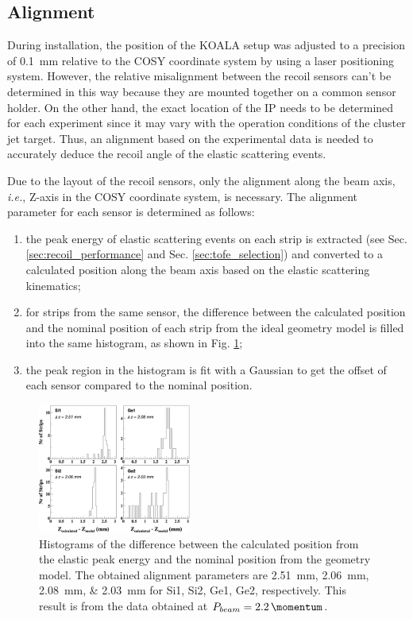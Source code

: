\documentclass[number,5p]{elsarticle}
\begin{document}
\subsection{Alignment}
\label{sec:alignment}

During installation, the position of the KOALA setup was adjusted to a precision
of \SI{0.1}{\mm} relative to the COSY coordinate system by using a laser positioning system.
However, the relative misalignment between the recoil sensors can't be
determined in this way because they are mounted together on a common sensor holder.
On the other hand, the exact location of the IP needs to be determined for each experiment since
it may vary with the operation conditions of the cluster jet target.
Thus, an alignment based on the experimental data is needed to accurately deduce the recoil angle of the elastic scattering events.

Due to the layout of the recoil sensors, only the alignment along
the beam axis, \textit{i.e.}, Z-axis in the COSY coordinate system, is necessary.
The alignment parameter for each sensor is determined as follows:
\begin{enumerate}
\item the peak energy of elastic scattering events on each strip is extracted
  (see Sec. \ref{sec:recoil_performance} and Sec. \ref{sec:tofe_selection}) and converted to a calculated position along the beam axis based on the elastic
  scattering kinematics;
\item for strips from the same sensor, the difference between the calculated
  position and the nominal position of each strip from the ideal geometry model is filled into the same histogram, as shown in Fig. \ref{fig:alignment};
\item the peak region in the histogram is fit with a Gaussian to get the offset
  of each sensor compared to the nominal position.
\end{enumerate}
\begin{figure}[h!]
  \centering
  \includegraphics[width=0.45\textwidth]{./alignment_reorder.png}
  \caption{Histograms of the difference between the calculated position from the
    elastic peak energy and the nominal position from the geometry model.
    The obtained alignment parameters are
    \SIlist[list-units=single]{2.51;2.06;2.08;2.03}{\mm} for Si1, Si2, Ge1, Ge2, respectively.
    This result is from the data obtained at $P_{beam} =
    \SI{2.2}{\momentum}$.}
  \label{fig:alignment}
\end{figure}
\end{document}
